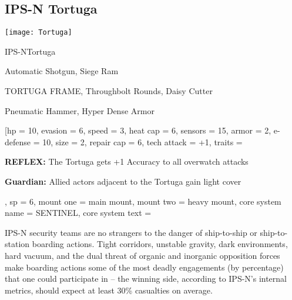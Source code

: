 \subsection{IPS-N Tortuga}

\begin{center}
    \texttt{[image: Tortuga]}
\end{center}

\begin{mech}{IPS-N}{Tortuga}


\begin{license}
\item Automatic Shotgun, Siege Ram
\item TORTUGA FRAME, Throughbolt Rounds, Daisy Cutter
\item Pneumatic Hammer, Hyper Dense Armor
\end{license}

\frameBox
[hp = 10,
evasion = 6,
speed = 3,
heat cap = 6,
sensors = 15,
armor = 2,
e-defense = 10,
size = 2,
repair cap = 6,
tech attack = +1,
traits = {\textbf{REFLEX:} The Tortuga gets +1 Accuracy to all overwatch attacks

\textbf{Guardian:} Allied actors adjacent to the Tortuga gain light cover },
sp = 6,
mount one = main mount,
mount two = heavy mount,
core system name = SENTINEL,
core system text = {IPS-N security teams are no strangers to the danger of ship-to-ship or ship-to-station boarding actions. Tight corridors, unstable gravity, dark environments, hard vacuum, and the dual threat of organic and inorganic opposition forces make boarding actions some of the most deadly engagements (by percentage) that one could participate in -- the winning side, according to IPS-N’s internal metrics, should expect at least 30\% casualties on average.

}
\end{mech}
